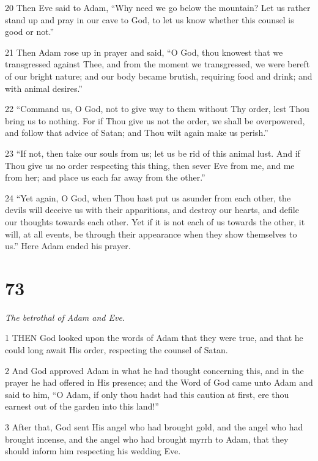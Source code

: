 \par 20 Then Eve said to Adam, “Why need we go below the mountain? Let us rather stand up and pray in our cave to God, to let us know whether this counsel is good or not.”

\par 21 Then Adam rose up in prayer and said, “O God, thou knowest that we transgressed against Thee, and from the moment we transgressed, we were bereft of our bright nature; and our body became brutish, requiring food and drink; and with animal desires.”

\par 22 “Command us, O God, not to give way to them without Thy order, lest Thou bring us to nothing. For if Thou give us not the order, we shall be overpowered, and follow that advice of Satan; and Thou wilt again make us perish.”

\par 23 “If not, then take our souls from us; let us be rid of this animal lust. And if Thou give us no order respecting this thing, then sever Eve from me, and me from her; and place us each far away from the other.”

\par 24 “Yet again, O God, when Thou hast put us asunder from each other, the devils will deceive us with their apparitions, and destroy our hearts, and defile our thoughts towards each other. Yet if it is not each of us towards the other, it will, at all events, be through their appearance when they show themselves to us.” Here Adam ended his prayer.

\chapter{73}

\par \textit{The betrothal of Adam and Eve.}

\par 1 THEN God looked upon the words of Adam that they were true, and that he could long await His order, respecting the counsel of Satan.

\par 2 And God approved Adam in what he had thought concerning this, and in the prayer he had offered in His presence; and the Word of God came unto Adam and said to him, “O Adam, if only thou hadst had this caution at first, ere thou earnest out of the garden into this land!”

\par 3 After that, God sent His angel who had brought gold, and the angel who had brought incense, and the angel who had brought myrrh to Adam, that they should inform him respecting his wedding Eve.

